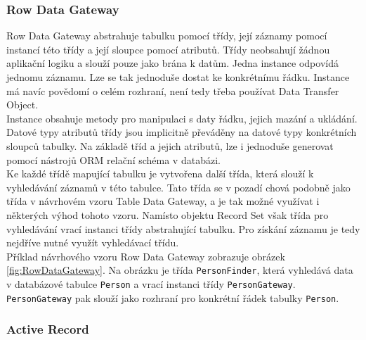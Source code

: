 \documentclass[ing,male,java,dept456]{diploma}						%
\begin{document}

\subsubsection{Row Data Gateway}

Row Data Gateway abstrahuje tabulku pomocí třídy, její záznamy pomocí instancí této třídy a její sloupce pomocí atributů. Třídy neobsahují žádnou aplikační logiku a slouží pouze jako brána k datům. Jedna instance odpovídá jednomu záznamu. Lze se tak jednoduše dostat ke konkrétnímu řádku. Instance má navíc povědomí o celém rozhraní, není tedy třeba používat Data Transfer Object. \\
Instance obsahuje metody pro manipulaci s daty řádku, jejich mazání a ukládání. Datové typy atributů třídy jsou implicitně převáděny na datové typy konkrétních sloupců tabulky. Na základě tříd a jejich atributů, lze i jednoduše generovat pomocí nástrojů ORM relační schéma v databázi. \\
Ke každé třídě mapující tabulku je vytvořena další třída, která slouží k vyhledávání záznamů v této tabulce. Tato třída se v pozadí chová podobně jako třída v návrhovém vzoru Table Data Gateway, a je tak možné využívat i některých výhod tohoto vzoru. Namísto objektu Record Set však třída pro vyhledávání vrací instanci třídy abstrahující tabulku. Pro získání záznamu je tedy nejdříve nutné využít vyhledávací třídu. \\
Příklad návrhového vzoru Row Data Gateway zobrazuje obrázek \ref{fig:RowDataGateway}. Na obrázku je třída \lstinline[style=inlinepython]|PersonFinder|, která vyhledává data v databázové tabulce \lstinline[style=inlinepython]|Person| a vrací instanci třídy \lstinline[style=inlinepython]|PersonGateway|. \lstinline[style=inlinepython]|PersonGateway| pak slouží jako rozhraní pro konkrétní řádek tabulky \lstinline[style=inlinepython]|Person|. \\


\subsubsection{Active Record}
\label{subsubsec:ActiveRecord}
\end{document}
